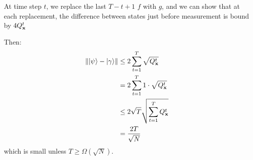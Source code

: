 \begin{theorem}
    At time step $t$, we replace the last $T - t + 1$ $f$ with $g$, and we can show that at each replacement, the difference between states just before measurement is bound by $4Q_{\mathbf{x}}^t$
\end{theorem}
Then:
\begin{align*}
    \norm{\ket{\psi} - \ket{\gamma}} &\le 2 \sum_{t = 1}^{T} \sqrt{Q_{\mathbf{x}}^t} \\
    &= 2 \sum_{t = 1}^{T} 1 \cdot \sqrt{Q_{\mathbf{x}}^t} \\
    &\le 2 \sqrt{T} \sqrt{\sum_{t = 1}^{T} Q_{\mathbf{x}}^t} \\
    &= \frac{2T}{\sqrt{N}}
\end{align*}
which is small unless $T \ge \Omega(\sqrt{N})$.

\newpage